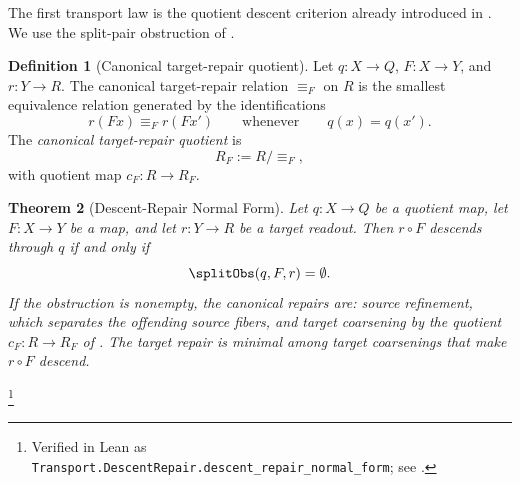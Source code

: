 \documentclass[11pt]{article}
\newtheorem{theorem}{Theorem}[section]
\theoremstyle{definition}
\newtheorem{definition}[theorem]{Definition}
\begin{document}
The first transport law is the quotient descent criterion already
introduced in .  We use the split-pair obstruction of
.

\begin{definition}[Canonical target-repair quotient]\label{def:target-repair}
Let \(q:X\to Q\), \(F:X\to Y\), and \(r:Y\to R\).  The canonical
target-repair relation \(\equiv_F\) on \(R\) is the smallest
equivalence relation generated by the identifications
\[
  r(Fx)\equiv_F r(Fx')
  \qquad\text{whenever}\qquad
  q(x)=q(x').
\]
The \emph{canonical target-repair quotient} is
\[
  R_F:=R/{\equiv_F},
\]
with quotient map \(c_F:R\to R_F\).
\end{definition}

\begin{theorem}[Descent-Repair Normal Form]\label{thm:F2}
Let \(q:X\to Q\) be a quotient map, let \(F:X\to Y\) be a map, and
let \(r:Y\to R\) be a target readout.  Then \(r\circ F\) descends
through \(q\) if and only if
\[
  \splitObs(q,F,r)=\emptyset .
\]
If the obstruction is nonempty, the canonical repairs are: source
refinement, which separates the offending source fibers, and target
coarsening by the quotient \(c_F:R\to R_F\) of
.  The target repair is minimal among target
coarsenings that make \(r\circ F\) descend.
\end{theorem}
\footnote{Verified in Lean as
\texttt{Transport.DescentRepair.\allowbreak{}descent\_repair\_normal\_form};
see .}
\end{document}
